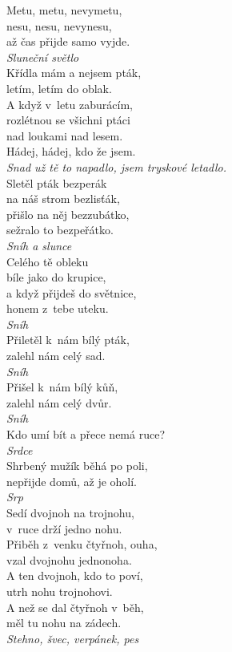 \begin{multicols}{3}
\noindent
Metu, metu, nevymetu,\\
nesu, nesu, nevynesu,\\
až čas přijde samo vyjde.\\[1 mm]
{\sl Sluneční světlo}\\

\noindent
Křídla mám a nejsem pták,\\
letím, letím do oblak.\\
A když v~letu zaburácím,\\
rozlétnou se všichni ptáci\\
nad loukami nad lesem.\\
Hádej, hádej, kdo že jsem.\\[1 mm]
{\sl Snad už tě to napadlo, jsem tryskové letadlo.}\\

\noindent
Sletěl pták bezperák\\
na náš strom bezlisťák,\\
přišlo na něj bezzubátko,\\
sežralo to bezpeřátko.\\[1 mm]
{\sl Sníh a slunce}\\

\noindent
Celého tě obleku\\
bíle jako do krupice,\\
a když přijdeš do světnice,\\
honem z~tebe uteku.\\[1 mm]
{\sl Sníh}\\

\noindent
Přiletěl k~nám bílý pták,\\
zalehl nám celý sad.\\[1 mm]
{\sl Sníh}\\

\noindent
Přišel k~nám bílý kůň,\\
zalehl nám celý dvůr.\\[1 mm]
{\sl Sníh}\\

\noindent
Kdo umí bít a přece nemá ruce?\\[1 mm]
{\sl Srdce}\\

\noindent
Shrbený mužík běhá po poli,\\
nepřijde domů, až je oholí.\\[1 mm]
{\sl Srp}\\

\noindent
Sedí dvojnoh na trojnohu,\\
v~ruce drží jedno nohu.\\
Přiběh z~venku čtyřnoh, ouha,\\
vzal dvojnohu jednonoha.\\
A ten dvojnoh, kdo to poví,\\
utrh nohu trojnohovi.\\
A než se dal čtyřnoh v~běh,\\
měl tu nohu na zádech.\\[1 mm]
{\sl Stehno, švec, verpánek, pes}\\


\end{multicols}
